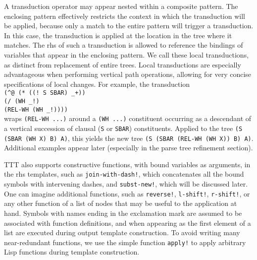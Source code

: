 \documentclass[a4,11pt]{article}
\begin{document}
A transduction operator may appear nested within a composite pattern.  The enclosing pattern effectively restricts the context in which the transduction will be applied, because only a match to the entire pattern will trigger a transduction.   In this case, the transduction is applied at the location in the tree where it matches.  The rhs of such a transduction is allowed to reference the bindings of variables that appear in the enclosing pattern. We call these local transductions, as distinct from replacement of entire trees.  Local transductions are especially advantageous when performing vertical path operations, allowing for very concise specifications of local changes. For example,  the transduction\\
\hspace*{1em} \texttt{(\^{}@ (* ((!~S SBAR) \_+))}\\
\hspace*{3.4em} \texttt{(/ (WH \_!)}\\
\hspace*{5.2em} \texttt{(REL-WH (WH \_!))))}\\
wraps \texttt{(REL-WH ...)} around a \texttt{(WH ...)} constituent occurring as a descendant of a vertical succession of clausal (\texttt{S} or \texttt{SBAR}) constituents. Applied to the tree \texttt{(S (SBAR (WH X) B) A)}, this yields the new tree \texttt{(S (SBAR (REL-WH (WH X)) B) A)}.  Additional examples appear later (especially in the parse tree refinement section). 

TTT also supports constructive functions, with bound variables as arguments, in the rhs templates, such as \texttt{join-with-dash!}, which concatenates all the bound symbols with intervening dashes, and \texttt{subst-new!}, which will be discussed later. One can imagine additional functions, such as \texttt{reverse!}, \texttt{l-shift!}, \texttt{r-shift!}, or any other function of a list of nodes that may be useful to the application at hand.  Symbols with names ending in the exclamation mark are assumed to be associated with function definitions, and when appearing as the first element of a list are executed during output template construction.  To avoid writing many near-redundant functions, we use the simple function \texttt{apply!} to apply arbitrary Lisp functions during template construction.
\end{document}
